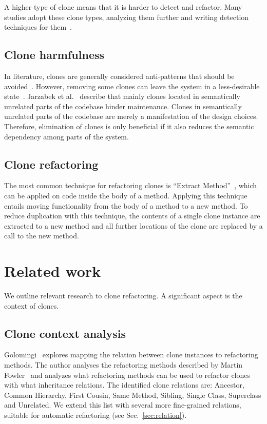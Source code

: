 \documentclass[sigconf,review,anonymous]{acmart}
\begin{document}
A higher type of clone means that it is harder to detect and refactor. Many studies adopt these clone types, analyzing them further and writing detection techniques for them~\cite{sajnani2016sourcerercc, kodhai2010detection, van2019novel}.

\subsection{Clone harmfulness}
In literature, clones are generally considered anti-patterns that should be avoided~\cite{fowler2018refactoring, ostberg2014automatically, chatterji2013effects}. However, removing some clones can leave the system in a less-desirable state~\cite{jarzabek2010clones, kapser2008cloning}. Jarzabek et al.~\cite{jarzabek2010clones} describe that mainly clones located in semantically unrelated parts of the codebase hinder maintenance. Clones in semantically unrelated parts of the codebase are merely a manifestation of the design choices. Therefore, elimination of clones is only beneficial if it also reduces
the semantic dependency among parts of the system.

\subsection{Clone refactoring}
The most common technique for refactoring clones is ``Extract Method''~\cite{fowler2018refactoring}, which can be applied on code inside the body of a method. Applying this technique entails moving functionality from the body of a method to a new method. To reduce duplication with this technique, the contents of a single clone instance are extracted to a new method and all further locations of the clone are replaced by a call to the new method.

\section{Related work}\label{sec:relatedwork}
We outline relevant research to clone refactoring. A significant aspect is the context of clones.

\subsection{Clone context analysis}\label{sec:rw:contextanalysis}
Golomingi~\cite{koni2001scenario} explores mapping the relation between clone instances to refactoring methods. The author analyses the refactoring methods described by Martin Fowler~\cite{fowler1999refactoring} and analyzes what refactoring methods can be used to refactor clones with what inheritance relations. The identified clone relations are: Ancestor, Common Hierarchy, First Cousin, Same Method, Sibling, Single Class, Superclass and Unrelated. We extend this list with several more fine-grained relations, suitable for automatic refactoring (see Sec.~\ref{sec:relation}).
\end{document}
